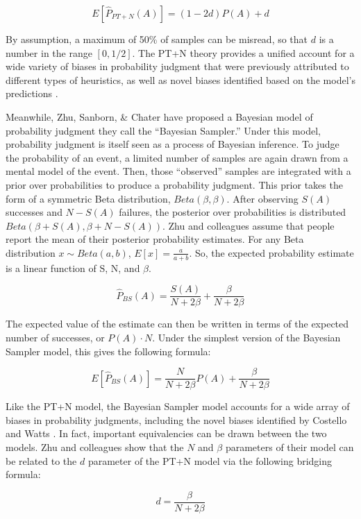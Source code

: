 \documentclass[
  man,floatsintext]{apa6}
\begin{document}
\[E[\hat{P}_{PT+N}(A)] = (1-2d)P(A) + d \]

By assumption, a maximum of 50\% of samples can be misread, so that \(d\) is a number in the range \([0, 1/2]\). The PT+N theory provides a unified account for a wide variety of biases in probability judgment that were previously attributed to different types of heuristics, as well as novel biases identified based on the model's predictions \autocite{costello.watts2014,costello.watts2016,costello.watts2017,costello.watts2018}.

Meanwhile, Zhu, Sanborn, \& Chater \autocite*{zhu.etal2020} have proposed a Bayesian model of probability judgment they call the ``Bayesian Sampler.'' Under this model, probability judgment is itself seen as a process of Bayesian inference. To judge the probability of an event, a limited number of samples are again drawn from a mental model of the event. Then, those ``observed'' samples are integrated with a prior over probabilities to produce a probability judgment. This prior takes the form of a symmetric Beta distribution, \(Beta(\beta, \beta)\). After observing \(S(A)\) successes and \(N - S(A)\) failures, the posterior over probabilities is distributed \(Beta(\beta + S(A), \beta + N - S(A))\). Zhu and colleagues \autocite*{zhu.etal2020} assume that people report the mean of their posterior probability estimates. For any Beta distribution \(x \sim Beta(a,b)\), \(E[x] = \frac{a}{a+b}\). So, the expected probability estimate is a linear function of S, N, and \(\beta\).

\[\hat{P}_{BS}(A) = \frac{S(A)}{N+2\beta} + \frac{\beta}{N+2\beta}\]

The expected value of the estimate can then be written in terms of the expected number of successes, or \(P(A) \cdot N\). Under the simplest version of the Bayesian Sampler model, this gives the following formula:

\[E[\hat{P}_{BS}(A)] = \frac{N}{N+2\beta}P(A) + \frac{\beta}{N+2\beta}\]

Like the PT+N model, the Bayesian Sampler model accounts for a wide array of biases in probability judgments, including the novel biases identified by Costello and Watts \autocite{costello.watts2014,costello.watts2016}. In fact, important equivalencies can be drawn between the two models. Zhu and colleagues \autocite*{zhu.etal2020} show that the \(N\) and \(\beta\) parameters of their model can be related to the \(d\) parameter of the PT+N model via the following bridging formula:

\[d = \frac{\beta}{N+2\beta}\]
\end{document}
